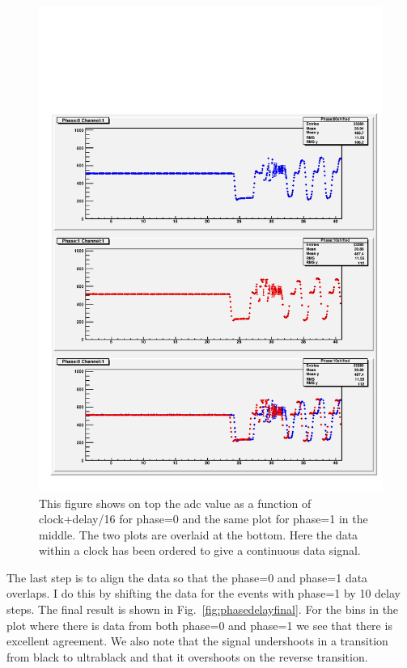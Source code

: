 \begin{figure}
\begin{center}
\includegraphics[width=\linewidth]{phaseAndDelayPlotShifted_channe_1_1}
\end{center}
\caption{This figure shows on top the adc value as a function of clock+delay/16 for phase=0 and the same plot for phase=1 in the middle. The two plots are overlaid at the bottom. Here the data within a clock has been ordered to give a continuous data signal.}
\label{fig:phasedelayshifted}
\end{figure}

The last step is to align the data so that the phase=0 and phase=1  data overlaps. I do this by shifting the data for the events with phase=1 by 10 delay steps. The final result is shown in  Fig.~\ref{fig:phasedelayfinal}. For the bins in the plot where there is data from both phase=0 and phase=1 we see that there is excellent agreement. We also note that the signal undershoots in a transition from black to ultrablack and that it overshoots on the reverse transition.

